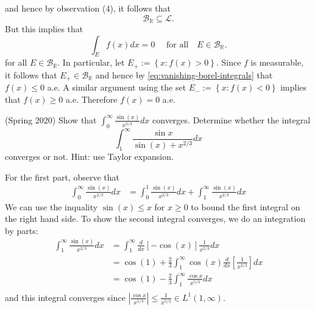 \documentclass{exam}
\theoremstyle{problemstyle}
\newcommand{\1}[1]{\textbf{1}_{\left[#1\right]}} %
\begin{document}
\begin{questions}
\begin{solution}
and hence by observation (4), it follows that
\begin{equation*}
  \mathcal{B}_{\mathbb{R}}\subseteq  \mathcal{L}.
\end{equation*}
But this implies that
\begin{equation}\label{eq:vanishing-borel-integrals}
  \int_{E}f(x)dx = 0 \quad\text{ for all}\quad E\in \mathcal{B}_{\mathbb{R}}.
\end{equation}
for all $E\in \mathcal{B}_{\mathbb{R}}$. In particular, let $E_{+}:= \left\{x:
  f(x)>0\right\}$. Since $f$ is measurable, it follows that $E_{+}\in \mathcal{B}_{\mathbb{R}}$
and hence by \eqref{eq:vanishing-borel-integrals} that $f(x)\leq 0$ a.e. A
similar argument using the set $E_{-}:= \left\{x: f(x)<0\right\}$ implies that
$f(x)\geq 0$ a.e. Therefore $f(x)=0$ a.e.
\end{solution}





\question (Spring 2020) Show that $\int_{0}^{\infty}\frac{\sin(x)}{x^{2/3}}dx$
converges. Determine whether the integral
\begin{equation*}
  \int_{1}^{\infty}\frac{\sin x}{\sin(x) +x^{2/3}} dx 
\end{equation*}
converges or not. Hint: use Taylor expansion.

\begin{solution}
For the first part, observe that
\begin{align*}
  \int_{0}^{\infty}\frac{\sin(x)}{x^{2/3}}dx
  &=  \int_{0}^{1}\frac{\sin(x)}{x^{2/3}}dx +  \int_{1}^{\infty}\frac{\sin(x)}{x^{2/3}}dx 
\end{align*}
We can use the inquality $\sin(x) \leq x$ for $x \geq 0$ to bound the first
integral on the right hand side. To show the second integral converges, we do
an integration by parts:
\begin{align*}
  \int_{1}^{\infty}\frac{\sin(x)}{x^{2/3}}dx
  &= \int_{1}^{\infty}\frac{d}{dx}\left[ -\cos(x) \right] \frac{1}{x^{2/3}}dx\\ 
  &= \cos(1) + \frac{2}{3}\int_{1}^{\infty}\cos(x) \frac{d}{dx} \left[  \frac{1}{x^{2/3}} \right] dx\\ 
  &= \cos(1) - \frac{2}{3}\int_{1}^{\infty} \frac{\cos x}{x^{5/3}} dx\\ 
\end{align*}
and this integral converges since $\left| \frac{\cos x}{x^{5/3}}  \right| \leq
\frac{1}{x^{5/3}}\in L^{1}(1,\infty)$.  


\end{solution}
\end{questions}
\end{document}
